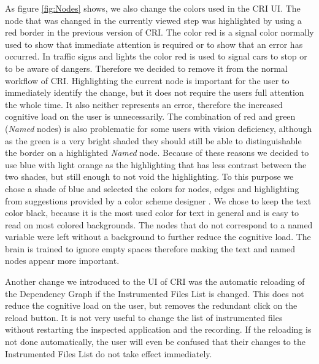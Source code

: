 As figure \ref{fig:Nodes} shows, we also change the colors used in the CRI UI. The node that was changed in the currently viewed step was highlighted by using a red border in the previous version of CRI. The color red is a signal color normally used to show that immediate attention is required or to show that an error has occurred. In traffic signs and lights the color red is used to signal cars to stop or to be aware of dangers. Therefore we decided to remove it from the normal workflow of CRI. Highlighting the current node is important for the user to immediately identify the change, but it does not require the users full attention the whole time. It also neither represents an error, therefore the increased cognitive load on the user is unnecessarily. The combination of red and green (\emph{Named} nodes) is also problematic for some users with vision deficiency, although as the green is a very bright shaded they should still be able to distinguishable the border on a highlighted \emph{Named} node. Because of these reasons we decided to use blue with light orange as the highlighting that has less contrast between the two shades, but still enough to not void the highlighting. To this purpose we chose a shade of blue and selected the colors for nodes, edges and highlighting from suggestions provided by a color scheme designer \cite{Paletton}. We chose to keep the text color black, because it is the most used color for text in general and is easy to read on most colored backgrounds. The nodes that do not correspond to a named variable were left without a background to further reduce the cognitive load. The brain is trained to ignore empty spaces therefore making the text and named nodes appear more important.

Another change we introduced to the UI of CRI was the automatic reloading of the Dependency Graph if the Instrumented Files List is changed. This does not reduce the cognitive load on the user, but removes the redundant click on the reload button. It is not very useful to change the list of instrumented files without restarting the inspected application and the recording. If the reloading is not done automatically, the user will even be confused that their changes to the Instrumented Files List do not take effect immediately.
	
